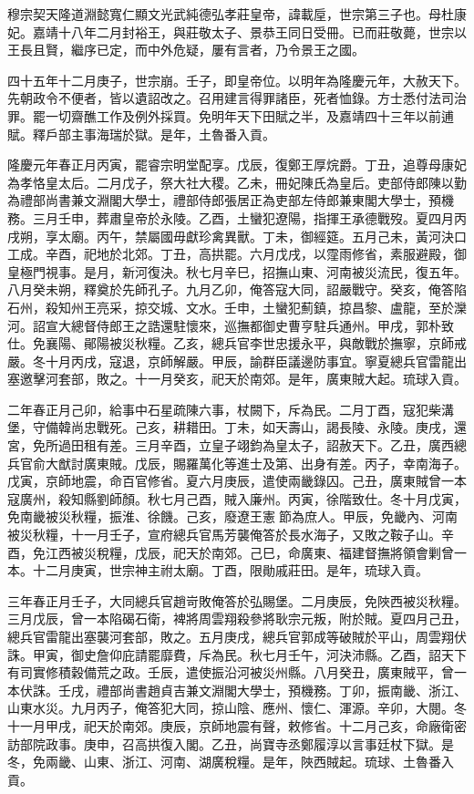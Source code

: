 
\begin{pinyinscope}
穆宗契天隆道淵懿寬仁顯文光武純德弘孝莊皇帝，諱載垕，世宗第三子也。母杜康妃。嘉靖十八年二月封裕王，與莊敬太子、景恭王同日受冊。已而莊敬薨，世宗以王長且賢，繼序已定，而中外危疑，屢有言者，乃令景王之國。

四十五年十二月庚子，世宗崩。壬子，即皇帝位。以明年為隆慶元年，大赦天下。先朝政令不便者，皆以遺詔改之。召用建言得罪諸臣，死者恤錄。方士悉付法司治罪。罷一切齋醮工作及例外採買。免明年天下田賦之半，及嘉靖四十三年以前逋賦。釋戶部主事海瑞於獄。是年，土魯番入貢。

隆慶元年春正月丙寅，罷睿宗明堂配享。戊辰，復鄭王厚烷爵。丁丑，追尊母康妃為孝恪皇太后。二月戊子，祭大社大稷。乙未，冊妃陳氏為皇后。吏部侍郎陳以勤為禮部尚書兼文淵閣大學士，禮部侍郎張居正為吏部左侍郎兼東閣大學士，預機務。三月壬申，葬肅皇帝於永陵。乙酉，土蠻犯遼陽，指揮王承德戰歿。夏四月丙戌朔，享太廟。丙午，禁屬國毋獻珍禽異獸。丁未，御經筵。五月己未，黃河決口工成。辛酉，祀地於北郊。丁丑，高拱罷。六月戊戌，以霪雨修省，素服避殿，御皇極門視事。是月，新河復決。秋七月辛巳，招撫山東、河南被災流民，復五年。八月癸未朔，釋奠於先師孔子。九月乙卯，俺答寇大同，詔嚴戰守。癸亥，俺答陷石州，殺知州王亮采，掠交城、文水。壬申，土蠻犯薊鎮，掠昌黎、盧龍，至於灤河。詔宣大總督侍郎王之誥還駐懷來，巡撫都御史曹亨駐兵通州。甲戌，郭朴致仕。免襄陽、鄖陽被災秋糧。乙亥，總兵官李世忠援永平，與敵戰於撫寧，京師戒嚴。冬十月丙戌，寇退，京師解嚴。甲辰，諭群臣議邊防事宜。寧夏總兵官雷龍出塞邀擊河套部，敗之。十一月癸亥，祀天於南郊。是年，廣東賊大起。琉球入貢。

二年春正月己卯，給事中石星疏陳六事，杖闕下，斥為民。二月丁酉，寇犯柴溝堡，守備韓尚忠戰死。己亥，耕耤田。丁未，如天壽山，謁長陵、永陵。庚戌，還宮，免所過田租有差。三月辛酉，立皇子翊鈞為皇太子，詔赦天下。乙丑，廣西總兵官俞大猷討廣東賊。戊辰，賜羅萬化等進士及第、出身有差。丙子，幸南海子。戊寅，京師地震，命百官修省。夏六月庚辰，遣使兩畿錄囚。己丑，廣東賊曾一本寇廣州，殺知縣劉師顏。秋七月己酉，賊入廉州。丙寅，徐階致仕。冬十月戊寅，免南畿被災秋糧，振淮、徐饑。己亥，廢遼王憲節為庶人。甲辰，免畿內、河南被災秋糧，十一月壬子，宣府總兵官馬芳襲俺答於長水海子，又敗之鞍子山。辛酉，免江西被災稅糧，戊辰，祀天於南郊。己巳，命廣東、福建督撫將領會剿曾一本。十二月庚寅，世宗神主祔太廟。丁酉，限勛戚莊田。是年，琉球入貢。

三年春正月壬子，大同總兵官趙岢敗俺答於弘賜堡。二月庚辰，免陜西被災秋糧。三月戊辰，曾一本陷碣石衛，裨將周雲翔殺參將耿宗元叛，附於賊。夏四月己丑，總兵官雷龍出塞襲河套部，敗之。五月庚戌，總兵官郭成等破賊於平山，周雲翔伏誅。甲寅，御史詹仰庇請罷靡費，斥為民。秋七月壬午，河決沛縣。乙酉，詔天下有司實修積穀備荒之政。壬辰，遣使振沿河被災州縣。八月癸丑，廣東賊平，曾一本伏誅。壬戌，禮部尚書趙貞吉兼文淵閣大學士，預機務。丁卯，振南畿、浙江、山東水災。九月丙子，俺答犯大同，掠山陰、應州、懷仁、渾源。辛卯，大閱。冬十一月甲戌，祀天於南郊。庚辰，京師地震有聲，敕修省。十二月己亥，命廠衛密訪部院政事。庚申，召高拱復入閣。乙丑，尚寶寺丞鄭履淳以言事廷杖下獄。是冬，免兩畿、山東、浙江、河南、湖廣稅糧。是年，陜西賊起。琉球、土魯番入貢。


\end{pinyinscope}
